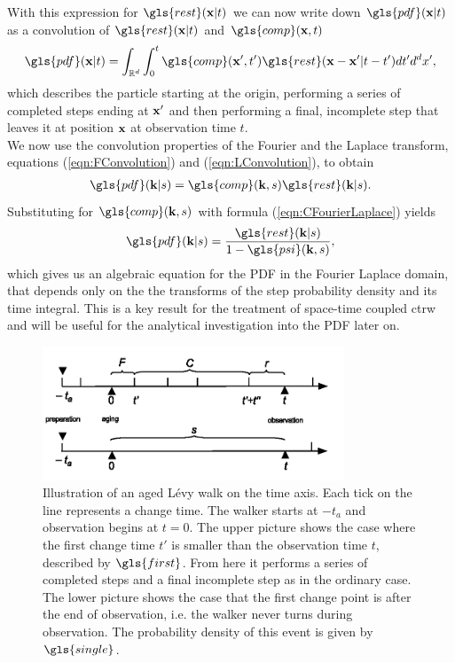 With this expression for $\gls{rest}(\ve{x}|t)$ we can now write down $\gls{pdf}(\ve{x}|t)$ as a convolution of $\gls{rest}(\ve{x}|t)$ and $\gls{comp}(\ve{x},t)$
%
\begin{align}
\gls{pdf}(\ve{x}|t) = \int_{\mathbb{R}^{d}} \int_0^t  \gls{comp}(\ve{x}',t') \gls{rest}(\ve{x}-\ve{x}'|t-t') d t' d^{d}x' ,
\end{align}
%
which describes the particle starting at the origin, performing a series of completed steps ending at $\mathbf{ x' }$ and then performing a final, incomplete step that leaves it at position $\mathbf{ x }$ at observation time $t$.\\
We now use the convolution properties of the Fourier and the Laplace transform, equations (\ref{eqn:FConvolution}) and (\ref{eqn:LConvolution}), to obtain 
%
\begin{align}
\gls{pdf}(\ve{k}|s) = \gls{comp}(\ve{k},s) \gls{rest}(\ve{k}|s) \label{eqn:pdfFourierLaplaceI} .
\end{align}
%
Substituting for $\gls{comp}(\ve{k},s)$ with formula (\ref{eqn:CFourierLaplace}) yields
%
\begin{align}
\gls{pdf}(\ve{k}|s) = \frac{ \gls{rest}(\ve{k}|s)}{1 - \gls{psi}(\ve{k},s)} \label{eqn:pdfFourierLaplaceII} ,
\end{align}
%
which gives us an algebraic equation for the \gls{PDF} in the Fourier Laplace domain, that depends only on the the transforms of the step probability density and its time integral. This is a key result for the treatment of space-time coupled \gls{ctrw} {\color{blue} and will be useful for the analytical investigation into the \gls{PDF} later on.} \\

\begin{figure}
\begin{center}
\includegraphics[width=90mm]{pics/timelineAged.png}
\caption{Illustration of an aged L\'evy walk on the time axis. Each tick on the line represents a change time. The walker starts at $-t_a$ and observation begins at $t=0$.  The upper picture shows the case where the first change time $t'$ is smaller than the observation time $t$, described by $\gls{first}$. From here it performs a series of completed steps and a final incomplete step as in the ordinary case. The lower picture shows the case that the first change point is after the end of observation, i.e. the walker never turns during observation. The probability density of this event is given by $\gls{single}$.
\label{fig:pdfAged}}
\end{center}
\end{figure}

